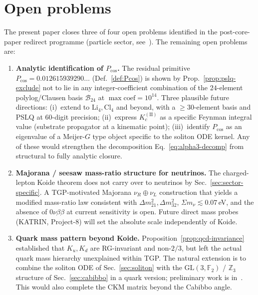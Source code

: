 \documentclass[11pt,a4paper]{article}
\newcommand{\Pcos}{P_{\cos}}
\newcommand{\GLtf}{\mathrm{GL}(3,\mathbb{F}_{2})}
\newcommand{\Zthree}{\mathbb{Z}_{3}}
\begin{document}
\section{Open problems}\label{sec:open-problems}

The present paper closes three of four open problems identified in the
post-core-paper redirect programme (particle sector, see~\cite{TGP-repo}).
The remaining open problems are:

\begin{enumerate}[(O1),leftmargin=1.4em,nosep]
\item \textbf{Analytic identification of $\Pcos$.}
The residual primitive $\Pcos=0.012615939290\ldots$
(Def.~\ref{def:Pcos}) is shown by Prop.~\ref{prop:pslq-exclude} not to
lie in any integer-coefficient combination of the $24$-element
polylog/Clausen basis $\mathcal{B}_{24}$ at $\max\mathrm{coef}=10^{14}$.
Three plausible future directions: (i)~extend to
$\mathrm{Li}_{4},\mathrm{Cl}_{4}$ and beyond, with a
$\ge 30$-element basis and PSLQ at $60$-digit precision;
(ii)~express $K_{c}^{(\mathrm{II})}$ as a specific Feynman integral
value (substrate propagator at a kinematic point);
(iii)~identify $\Pcos$ as an eigenvalue of a Meijer-$G$ type object
specific to the soliton ODE kernel. Any of these would strengthen the
decomposition Eq.~\eqref{eq:alpha3-decomp} from structural to fully
analytic closure.
\item \textbf{Majorana / seesaw mass-ratio structure for neutrinos.}
The charged-lepton Koide theorem does not carry over to neutrinos by
Sec.~\ref{sec:sector-specific}. A TGP-motivated Majorana
$\nu_{R}\oplus\nu_{L}$ construction that yields a modified
mass-ratio law consistent with $\Delta m^{2}_{21},\Delta m^{2}_{32}$,
$\Sigma m_{\nu}\lesssim 0.07$\,eV, and the absence of $0\nu\beta\beta$
at current sensitivity is open. Future direct mass probes (KATRIN,
Project-8) will set the absolute scale independently of Koide.
\item \textbf{Quark mass pattern beyond Koide.}
Proposition~\ref{prop:qcd-invariance} established that $K_{u},K_{d}$
are RG-invariant and non-$2/3$, but left the actual quark mass
hierarchy unexplained within TGP. The natural extension is to combine
the soliton ODE of Sec.~\ref{sec:soliton} with the
$\GLtf$ / $\Zthree$ structure of Sec.~\ref{sec:cabibbo} in a quark
version; preliminary work is in~\cite{TGP-repo}. This would also
complete the CKM matrix beyond the Cabibbo angle.
\end{enumerate}
\end{document}
